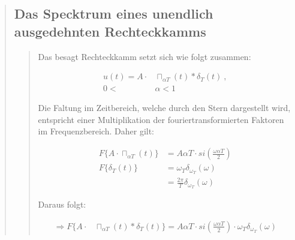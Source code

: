     \begin{quote}
   	
        \subsection{Das Specktrum eines unendlich ausgedehnten Rechteckkamms}
        \begin{quote}
            Das besagt Rechteckkamm setzt sich wie folgt zusammen:
          
            \vspace{1em}
            
            \begin{equation*}
            	\begin{split}
            		u(t) = A \cdot &\sqcap_{\alpha T}(t) \ast \delta_T(t)\ , \\
                    0 < &\alpha < 1
            	\end{split}
            \end{equation*}
          	
          	Die Faltung im Zeitbereich, welche durch den Stern dargestellt wird,
          	entspricht einer Multiplikation der fouriertransformierten Faktoren
          	im Frequenzbereich. Daher gilt:
          	
          	\vspace{1em}
          	
          	\begin{equation*}
            	\begin{split}
            		F\{ A \cdot \sqcap_{\alpha T}(t) \} &= A \alpha T \cdot si(\frac{\omega \alpha T}{2})\\
                    F\{ \delta_T(t) \} &= \omega_T \delta_{\omega_T} (\omega)\\
                    &= \frac{2 \pi}{T} \delta_{\omega_T} (\omega)
            	\end{split}
            \end{equation*}
          	          
          	Daraus folgt:
          	
          	\vspace{1em}
          	
          	\begin{equation*}
            	\begin{split}
            		\Rightarrow
            		F\{ A \cdot &\sqcap_{\alpha T}(t) \ast \delta_T(t)\} = A \alpha T \cdot si(\frac{\omega \alpha T}{2})
            		\cdot \omega_T \delta_{\omega_T} (\omega)
            	\end{split}
            \end{equation*}
          	
   		 \end{quote}  	
	\end{quote}
         	
